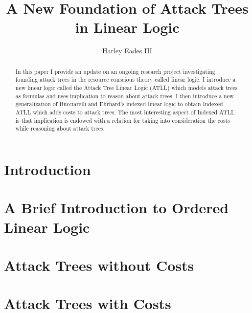 \documentclass{llncs}
\date{}
\begin{document}
\title{A New Foundation of Attack Trees in Linear Logic}

\author{Harley Eades III}

\maketitle 

\begin{abstract}
  In this paper I provide an update on an ongoing research project
  investigating founding attack trees in the resource conscious theory
  called linear logic.  I introduce a new linear logic called the
  Attack Tree Linear Logic (ATLL) which models attack trees as
  formulas and uses implication to reason about attack trees.  I then
  introduce a new generalization of Bucciarelli and Ehrhard’s indexed
  linear logic to obtain Indexed ATLL which adds costs to attack
  trees.  The most interesting aspect of Indexed ATLL is that
  implication is endowed with a relation for taking into consideration
  the costs while reasoning about attack trees.
\end{abstract}

\section{Introduction}
\label{sec:introduction}


\section{A Brief Introduction to Ordered Linear Logic}
\label{sec:a_brief_introduction_to_ordered_linear_logic}



\section{Attack Trees without Costs}
\label{sec:attack_trees_without_costs}


\section{Attack Trees with Costs}
\label{sec:attack_trees_with_costs}

\end{document}
